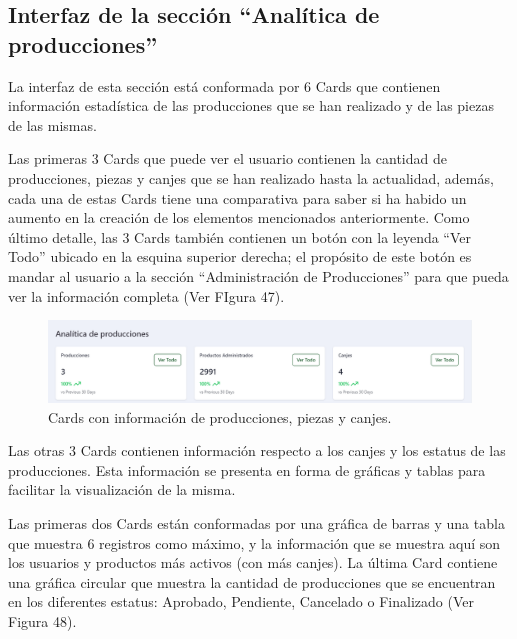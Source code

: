 \subsection{Interfaz de la sección ``Analítica de producciones''}
La interfaz de esta sección está conformada por 6 Cards que contienen información estadística de las producciones que se han realizado y de las piezas de las mismas. 

Las primeras 3 Cards que puede ver el usuario contienen la cantidad de producciones, piezas y canjes que se han realizado hasta la actualidad, además, cada una de estas Cards tiene una comparativa para saber si ha habido un aumento en la creación de los elementos mencionados anteriormente. Como último detalle, las 3 Cards también contienen un botón con la leyenda ``Ver Todo'' ubicado en la esquina superior derecha; el propósito de este botón es mandar al usuario a la sección ``Administración de Producciones'' para que pueda ver la información completa (Ver FIgura 47).

    \begin{figure}[H]
        \begin{center}
            \includegraphics[scale=0.45]{img/actividades/analitica-prod/number-cards.png}
            \caption{Cards con información de producciones, piezas y canjes.}
            \label{fig:number-cards}
        \end{center}
    \end{figure}

Las otras 3 Cards contienen información respecto a los canjes y los estatus de las producciones. Esta información se presenta en forma de gráficas y tablas para facilitar la visualización de la misma. 

Las primeras dos Cards están conformadas por una gráfica de barras y una tabla que muestra 6 registros como máximo, y la información que se muestra aquí son los usuarios y productos más activos (con más canjes). La última Card contiene una gráfica circular que muestra la cantidad de producciones que se encuentran en los diferentes estatus: Aprobado, Pendiente, Cancelado o Finalizado (Ver Figura 48). 

